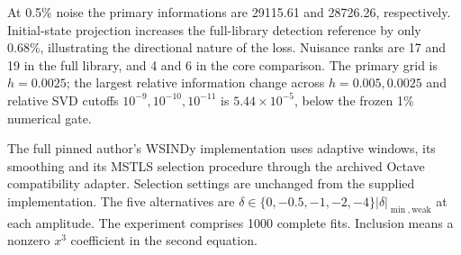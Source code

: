 \documentclass[
  american,
  11pt,
]{article}
\begin{document}
At 0.5\% noise the primary informations are 29115.61 and 28726.26,
respectively. Initial-state projection increases the full-library
detection reference by only 0.68\%, illustrating the directional nature
of the loss. Nuisance ranks are 17 and 19 in the full library, and 4 and
6 in the core comparison. The primary grid is \(h=0.0025\); the largest
relative information change across \(h=0.005,0.0025\) and relative SVD
cutoffs \(10^{-9},10^{-10},10^{-11}\) is \(5.44\times10^{-5}\), below
the frozen 1\% numerical gate.

The full pinned author's WSINDy implementation uses adaptive windows,
its smoothing and its MSTLS selection procedure through the archived
Octave compatibility adapter. Selection settings are unchanged from the
supplied implementation. The five alternatives are
\(\delta\in\{0,-0.5,-1,-2,-4\}|\delta|_{\min,\mathrm{weak}}\) at each
amplitude. The experiment comprises 1000 complete fits. Inclusion means
a nonzero \(x^3\) coefficient in the second equation.
\end{document}

